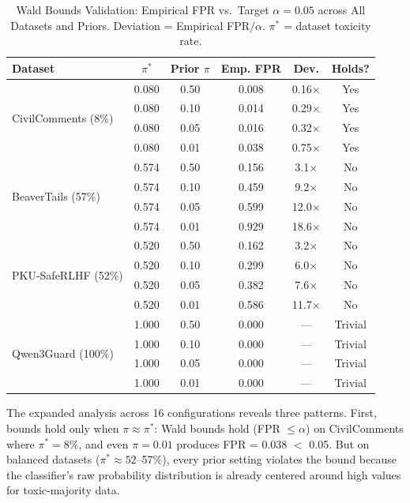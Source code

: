 \documentclass[acmtjournal, acmnowidth]{acmart}
\theoremstyle{definition}
\begin{document}
\begin{table}[h]
\caption{Wald Bounds Validation: Empirical FPR vs.\ Target $\alpha = 0.05$ across All Datasets and Priors. Deviation = Empirical FPR$/\alpha$. $\pi^*$ = dataset toxicity rate.}
\label{tab:wald_validation}
\small
\begin{tabular}{lccccc}
\toprule
Dataset & $\pi^*$ & Prior $\pi$ & Emp. FPR & Dev. & Holds? \\
\midrule
\multirow{4}{*}{CivilComments (8\%)}
 & 0.080 & 0.50 & 0.008 & 0.16$\times$ & Yes \\
 & 0.080 & 0.10 & 0.014 & 0.29$\times$ & Yes \\
 & 0.080 & 0.05 & 0.016 & 0.32$\times$ & Yes \\
 & 0.080 & 0.01 & 0.038 & 0.75$\times$ & Yes \\
\midrule
\multirow{4}{*}{BeaverTails (57\%)}
 & 0.574 & 0.50 & 0.156 & 3.1$\times$ & No \\
 & 0.574 & 0.10 & 0.459 & 9.2$\times$ & No \\
 & 0.574 & 0.05 & 0.599 & 12.0$\times$ & No \\
 & 0.574 & 0.01 & 0.929 & 18.6$\times$ & No \\
\midrule
\multirow{4}{*}{PKU-SafeRLHF (52\%)}
 & 0.520 & 0.50 & 0.162 & 3.2$\times$ & No \\
 & 0.520 & 0.10 & 0.299 & 6.0$\times$ & No \\
 & 0.520 & 0.05 & 0.382 & 7.6$\times$ & No \\
 & 0.520 & 0.01 & 0.586 & 11.7$\times$ & No \\
\midrule
\multirow{4}{*}{Qwen3Guard (100\%)}
 & 1.000 & 0.50 & 0.000 & --- & Trivial \\
 & 1.000 & 0.10 & 0.000 & --- & Trivial \\
 & 1.000 & 0.05 & 0.000 & --- & Trivial \\
 & 1.000 & 0.01 & 0.000 & --- & Trivial \\
\bottomrule
\end{tabular}
\end{table}

The expanded analysis across 16 configurations reveals three patterns. First, bounds hold only when $\pi \approx \pi^*$: Wald bounds hold (FPR $\leq \alpha$) on CivilComments where $\pi^* = 8\%$, and even $\pi = 0.01$ produces FPR = 0.038 $<$ 0.05. But on balanced datasets ($\pi^* \approx 52$--57\%), every prior setting violates the bound because the classifier's raw probability distribution is already centered around high values for toxic-majority data.
\end{document}
